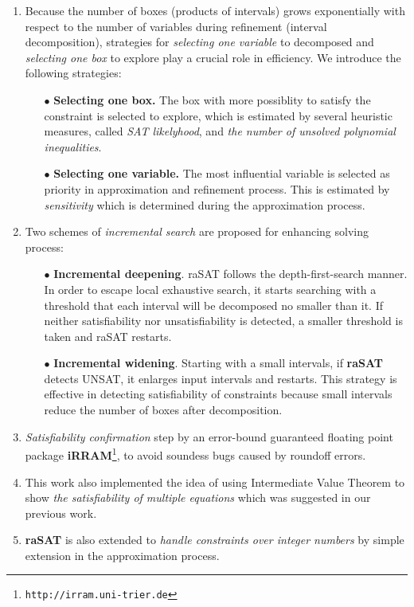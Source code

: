 \documentclass[12pt]{article}
\begin{document}
\begin{enumerate}
\item Because the number of boxes (products of intervals) grows exponentially with respect to the number of variables during refinement (interval decomposition), strategies for \emph{selecting one variable} to decomposed and \emph{selecting one box} to explore play a crucial role in efficiency. We introduce the following strategies:
\begin{itemize}
\item[$\bullet$] \textbf{Selecting one box.} The box with more possiblity to satisfy the constraint is selected to explore, which is estimated by 
several heuristic measures, called {\em SAT likelyhood}, 
and \emph{the number of unsolved polynomial inequalities}.
\item[$\bullet$] \textbf{Selecting one variable.} The most influential variable is selected as priority in approximation and refinement process. 
This is estimated by {\em sensitivity} which is determined during the approximation process.
\end{itemize}
\item Two schemes of \emph{incremental search} are proposed for enhancing solving process: 
\begin{itemize} 
\item[$\bullet$] {\bf Incremental deepening}. 
raSAT follows the depth-first-search manner. In order to escape local exhaustive search, it starts searching with a threshold that each interval will be decomposed no smaller than it. 
If neither satisfiability nor unsatisfiability is detected, a smaller threshold is taken and raSAT restarts. 
\item[$\bullet$] {\bf Incremental widening}. 
Starting with a small intervals, if \textbf{raSAT} detects UNSAT, it enlarges input intervals and restarts. This strategy is effective in detecting satisfiability of constraints because small intervals reduce the number of boxes after decomposition.
\end{itemize} 
\item \emph{Satisfiability confirmation} step by an error-bound guaranteed floating point package {\bf iRRAM}\footnote{%
\tt http://irram.uni-trier.de}, to avoid soundess bugs caused by roundoff errors.
\item This work also implemented the idea of using Intermediate Value Theorem to show \emph{the satisfiability of multiple equations} which was suggested in our previous work.
\item \textbf{raSAT} is also extended to \emph{handle constraints over integer numbers} by simple extension in the approximation process.
\end{enumerate}
\end{document}
